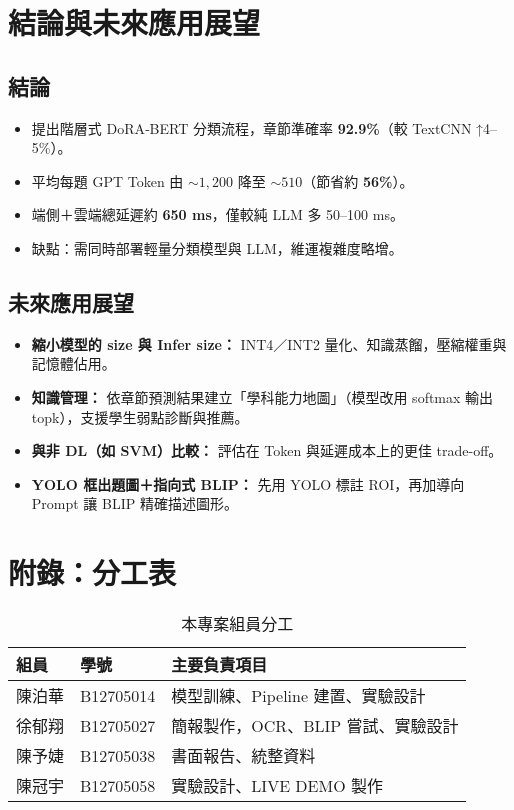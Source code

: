 \documentclass[10pt,conference]{IEEEtran}
\begin{document}
\begin{CJK}{UTF8}{bsmi}
\section{結論與未來應用展望}

\subsection{結論}
\begin{itemize}[nosep,leftmargin=1.5em]
  \item 提出階層式 DoRA‐BERT 分類流程，章節準確率 \textbf{92.9\%}（較 TextCNN ↑4–5\%）。  
  \item 平均每題 GPT Token 由 \(\sim\!1{,}200\) 降至 \(\sim\!510\)（節省約 \textbf{56\%}）。  
  \item 端側＋雲端總延遲約 \textbf{650 ms}，僅較純 LLM 多 50–100 ms。  
  \item 缺點：需同時部署輕量分類模型與 LLM，維運複雜度略增。  
\end{itemize}

\subsection{未來應用展望}
\begin{itemize}[nosep,leftmargin=1.5em]
  \item \textbf{縮小模型的 size 與 Infer size：} INT4／INT2 量化、知識蒸餾，壓縮權重與記憶體佔用。  
  \item \textbf{知識管理：} 依章節預測結果建立「學科能力地圖」（模型改用 softmax 輸出 topk），支援學生弱點診斷與推薦。  
  \item \textbf{與非 DL（如 SVM）比較：} 評估在 Token 與延遲成本上的更佳 trade-off。  
  \item \textbf{YOLO 框出題圖＋指向式 BLIP：} 先用 YOLO 標註 ROI，再加導向 Prompt 讓 BLIP 精確描述圖形。  
\end{itemize}

\appendices
\section{附錄：分工表}

\begin{table}[H]
  \centering
  \small           
  \begin{tabular}{@{}llp{6.8cm}@{}}
    \toprule
    組員 & 學號 & 主要負責項目 \\
    \midrule
    陳泊華 & B12705014 & 模型訓練、Pipeline 建置、實驗設計 \\
    徐郁翔 & B12705027 & 簡報製作，OCR、BLIP 嘗試、實驗設計 \\
    陳予婕 & B12705038 & 書面報告、統整資料 \\
    陳冠宇 & B12705058 & 實驗設計、LIVE DEMO 製作 \\
    \bottomrule
  \end{tabular}
  \caption{本專案組員分工}
  \label{tab:appendix}
\end{table}

\end{CJK}
\end{document}
